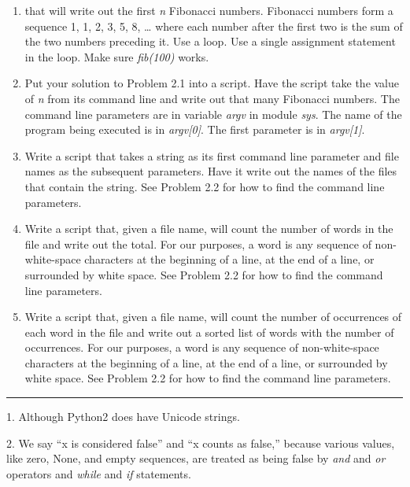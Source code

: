 \begin{enumerate}

\item
  
  that will write out the first \emph{n} Fibonacci numbers. Fibonacci
  numbers form a sequence 1, 1, 2, 3, 5, 8, \ldots{} where each number
  after the first two is the sum of the two numbers preceding it. Use a
  loop. Use a single assignment statement in the loop. Make sure
  \emph{fib(100)} works.
\item
  Put your solution to Problem 2.1
  into a script. Have the script take the value of \emph{n} from its
  command line and write out that many Fibonacci numbers. The command
  line parameters are in variable \emph{argv} in module \emph{sys}. The
  name of the program being executed is in \emph{argv{[}0{]}}. The
  first parameter is in \emph{argv{[}1{]}}.
\item
  Write a script that takes a
  string as its first command line parameter and file names as the
  subsequent parameters. Have it write out the names of the files that
  contain the string. See Problem 2.2 for how to find the command line
  parameters.
\item
  Write a script that, given a
  file name, will count the number of words in the file and write out
  the total. For our purposes, a word is any sequence of non-white-space
  characters at the beginning of a line, at the end of a line, or
  surrounded by white space. See Problem 2.2 for how to find the command
  line parameters.
\item
  Write a script that, given a
  file name, will count the number of occurrences of each word in the
  file and write out a sorted list of words with the number of
  occurrences. For our purposes, a word is any sequence of
  non-white-space characters at the beginning of a line, at the end of a
  line, or surrounded by white space. See Problem 2.2 for how to find
  the command line parameters.
\end{enumerate}

\begin{center}\rule{0.5\linewidth}{\linethickness}\end{center}

{ 1.} Although Python2 does have
Unicode strings.

{ 2.} We say ``x is considered
false'' and ``x counts as false,'' because various values, like zero,
None, and empty sequences, are treated as being false by \emph{and} and
\emph{or} operators and \emph{while} and \emph{if} statements.
